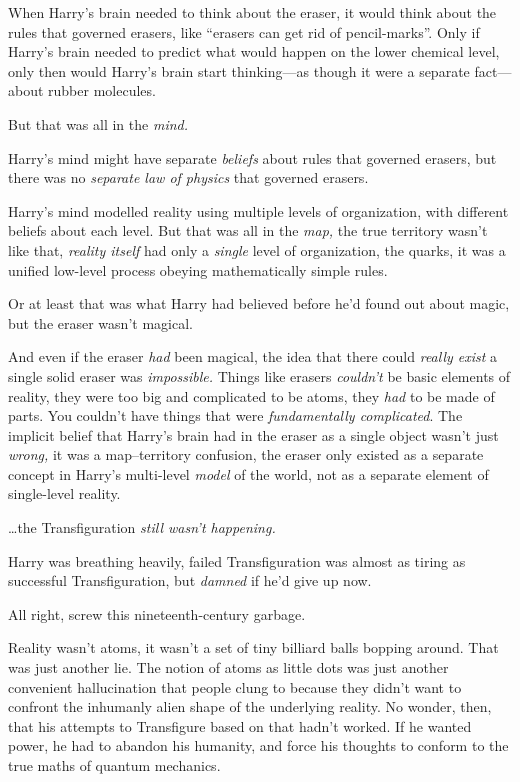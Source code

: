 When Harry’s brain needed to think about the eraser, it would think about the rules that governed erasers, like “erasers can get rid of pencil-marks”. Only if Harry’s brain needed to predict what would happen on the lower chemical level, only then would Harry’s brain start thinking—as though it were a separate fact—about rubber molecules.

But that was all in the \emph{mind.}

Harry’s mind might have separate \emph{beliefs} about rules that governed erasers, but there was no \emph{separate law of physics} that governed erasers.

Harry’s mind modelled reality using multiple levels of organization, with different beliefs about each level. But that was all in the \emph{map,} the true territory wasn’t like that, \emph{reality itself} had only a \emph{single} level of organization, the quarks, it was a unified low-level process obeying mathematically simple rules.

Or at least that was what Harry had believed before he’d found out about magic, but the eraser wasn’t magical.

And even if the eraser \emph{had} been magical, the idea that there could \emph{really exist} a single solid eraser was \emph{impossible.} Things like erasers \emph{couldn’t} be basic elements of reality, they were too big and complicated to be atoms, they \emph{had} to be made of parts. You couldn’t have things that were \emph{fundamentally complicated}. The implicit belief that Harry’s brain had in the eraser as a single object wasn’t just \emph{wrong,} it was a map–territory confusion, the eraser only existed as a separate concept in Harry’s multi-level \emph{model} of the world, not as a separate element of single-level reality.

…the Transfiguration \emph{still wasn’t happening.}

Harry was breathing heavily, failed Transfiguration was almost as tiring as successful Transfiguration, but \emph{damned} if he’d give up now.

All right, screw this nineteenth-century garbage.

Reality wasn’t atoms, it wasn’t a set of tiny billiard balls bopping around. That was just another lie. The notion of atoms as little dots was just another convenient hallucination that people clung to because they didn’t want to confront the inhumanly alien shape of the underlying reality. No wonder, then, that his attempts to Transfigure based on that hadn’t worked. If he wanted power, he had to abandon his humanity, and force his thoughts to conform to the true maths of quantum mechanics.

